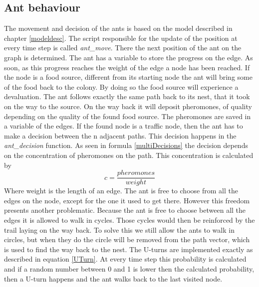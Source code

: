 \subsection{Ant behaviour}
The movement and decision of the ants is based on the model described in chapter \ref{modeldesc}. The script responsible for the update of the position at every time step is called \textit{ant\_move}. There the next position of the ant on the graph is determined. The ant has a variable to store the progress on the edge. As soon, as this progress reaches the weight of the edge a node has been reached. If the node is a food source, different from its starting node the ant will bring some of the food back to the colony. By doing so the food source will experience a devaluation. The ant follows exactly the same path back to its nest, that it took on the way to the source. On the way back it will deposit pheromones, of quality depending on the quality of the found food source. The pheromones are saved in a variable of the edges.
If the found node is a traffic node, then the ant has to make a decision between the n adjacent paths. This decision happens in the \textit{ant\_decision} function. As seen in formula \ref{multiDecisions} the decision depends on the concentration of pheromones on the path. This concentration is calculated by
\begin{equation}
c = \frac{pheromones}{weight}
\end{equation}
Where weight is the length of an edge. The ant is free to choose from all the edges on the node, except for the one it used to get there.
However this freedom presents another problematic. Because the ant is free to choose between all the edges it is allowed to walk in cycles. Those cycles would then be reinforced by the trail laying on the way back. To solve this we still allow the ants to walk in circles, but when they do the circle will be removed from the path vector, which is used to find the way back to the nest.
The U-turns are implemented exactly as described in equation \ref{UTurn}. At every time step this probability is calculated and if a random number between 0 and 1 is lower then the calculated probability, then a U-turn happens and the ant walks back to the last visited node. 